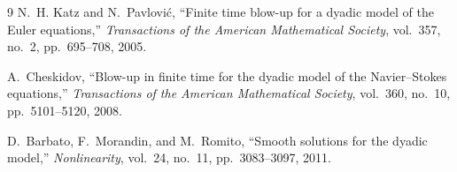 \documentclass[11pt,a4paper]{article}
\theoremstyle{definition}
\theoremstyle{remark}
\begin{document}
\begin{thebibliography}{9}
N.~H. Katz and N.~Pavlovi\'c, ``Finite time blow-up for a dyadic model of the Euler equations,'' \emph{Transactions of the American Mathematical Society}, vol.~357, no.~2, pp.~695--708, 2005.

A.~Cheskidov, ``Blow-up in finite time for the dyadic model of the Navier--Stokes equations,'' \emph{Transactions of the American Mathematical Society}, vol.~360, no.~10, pp.~5101--5120, 2008.

D.~Barbato, F.~Morandin, and M.~Romito, ``Smooth solutions for the dyadic model,'' \emph{Nonlinearity}, vol.~24, no.~11, pp.~3083--3097, 2011.
\end{thebibliography}
\end{document}
